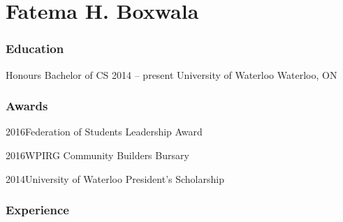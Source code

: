 \documentclass[fontsize=10pt]{tccv}
\begin{document}
\part{Fatema H. Boxwala}

\section{Education}

\begin{yearlist}

\item[Honours Bachelor of CS]{2014 -- present}
     {University of Waterloo}
     {Waterloo, ON}

\end{yearlist}

\section{Awards}
\begin{factlist}
\item{2016}{Federation of Students Leadership Award}
\item{2016}{WPIRG Community Builders Bursary}
\item{2014}{University of Waterloo President's Scholarship}
\end{factlist}

\section{Experience}
\end{document}
